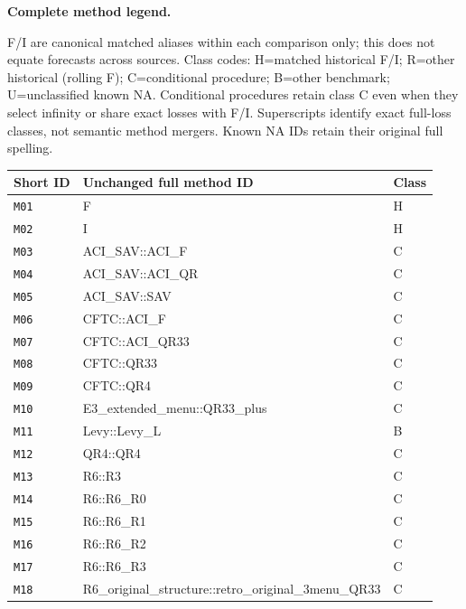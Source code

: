 \clearpage
\noindent\textbf{Complete method legend.}\par
F/I are canonical matched aliases within each comparison only; this does not equate forecasts across sources. Class codes: H=matched historical F/I; R=other historical (rolling F); C=conditional procedure; B=other benchmark; U=unclassified known NA. Conditional procedures retain class C even when they select infinity or share exact losses with F/I. Superscripts identify exact full-loss classes, not semantic method mergers. Known NA IDs retain their original full spelling.
\begin{longtable}{@{}lp{118mm}l@{}}
\toprule
Short ID & Unchanged full method ID & Class \\
\midrule
\endhead
\texttt{M01} & F & H \\
\texttt{M02} & I & H \\
\texttt{M03} & ACI\_\allowbreak{}SAV::\allowbreak{}ACI\_\allowbreak{}F & C \\
\texttt{M04} & ACI\_\allowbreak{}SAV::\allowbreak{}ACI\_\allowbreak{}QR & C \\
\texttt{M05} & ACI\_\allowbreak{}SAV::\allowbreak{}SAV & C \\
\texttt{M06} & CFTC::\allowbreak{}ACI\_\allowbreak{}F & C \\
\texttt{M07} & CFTC::\allowbreak{}ACI\_\allowbreak{}QR33 & C \\
\texttt{M08} & CFTC::\allowbreak{}QR33 & C \\
\texttt{M09} & CFTC::\allowbreak{}QR4 & C \\
\texttt{M10} & E3\_\allowbreak{}extended\_\allowbreak{}menu::\allowbreak{}QR33\_\allowbreak{}plus & C \\
\texttt{M11} & Levy::\allowbreak{}Levy\_\allowbreak{}L & B \\
\texttt{M12} & QR4::\allowbreak{}QR4 & C \\
\texttt{M13} & R6::\allowbreak{}R3 & C \\
\texttt{M14} & R6::\allowbreak{}R6\_\allowbreak{}R0 & C \\
\texttt{M15} & R6::\allowbreak{}R6\_\allowbreak{}R1 & C \\
\texttt{M16} & R6::\allowbreak{}R6\_\allowbreak{}R2 & C \\
\texttt{M17} & R6::\allowbreak{}R6\_\allowbreak{}R3 & C \\
\texttt{M18} & R6\_\allowbreak{}original\_\allowbreak{}structure::\allowbreak{}retro\_\allowbreak{}original\_\allowbreak{}3menu\_\allowbreak{}QR33 & C \\

\end{longtable}
